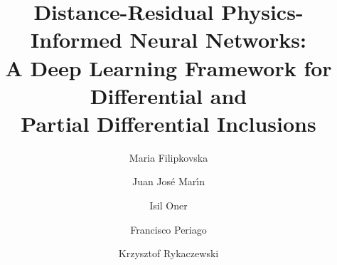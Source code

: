 \documentclass[11pt]{elsarticle}
\theoremstyle{definition}
\theoremstyle{remark}
\numberwithin{equation}{section}
\begin{document}
	
	\begin{frontmatter}
		
		\title{Distance-Residual Physics-Informed Neural Networks:\\
			A Deep Learning Framework for Differential and\\
			Partial Differential Inclusions}
		
		\author[verkin]{Maria Filipkovska}
		\author[upct]{Juan Jos\'e Mar\'{\i}n}
		\author[itu]{Isil Oner}
		\author[upct]{Francisco Periago}
		\author[coper]{Krzysztof Rykaczewski}
		
		
		\address[verkin]{B.\,Verkin Institute for Low Temperature Physics and Engineering of the National Academy of Sciences of Ukraine, Kharkiv 61103, Ukraine.}
		
		\address[upct]{Department of Applied Mathematics and Statistics, Universidad Polit\'ecnica de Cartagena, member of the European University of Technology EUT+, Campus Muralla del Mar, 30202 Cartagena, Murcia, Spain.}
		
		\address[itu]{Department of Mathematics, Faculty of Sciences, Gebze Technical University, Kocaeli 41400, Turkey.}
		
		\address[coper]{Faculty of Mathematics and Computer Science, Nicolaus Copernicus University in Toru\'n, Chopina 12/18, 87-100 Toru\'n, Poland.}
		

\end{frontmatter}
\end{document}
